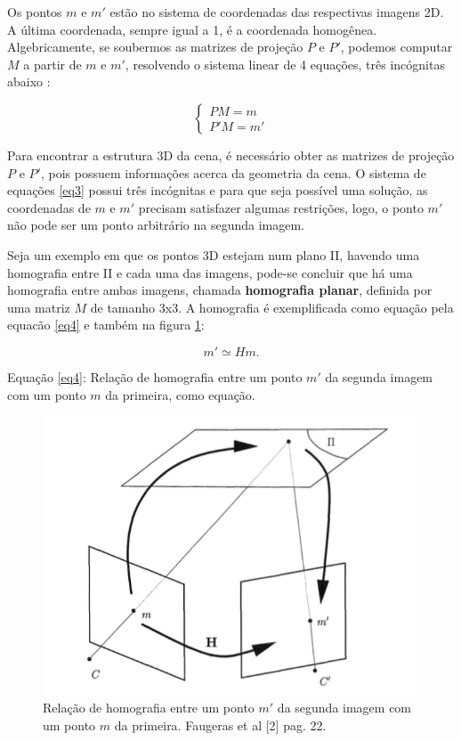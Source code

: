 Os pontos $m$ e $m'$ estão no sistema de coordenadas das respectivas imagens 2D. A última coordenada, sempre igual a 1, é a coordenada homogênea.
Algebricamente, se soubermos as matrizes de projeção $P$ e $P'$, podemos computar $M$ a partir de $m$ e $m'$, resolvendo o sistema linear de 4 equações, três incógnitas abaixo \cite{Faugeras-Geometry}:

\begin{equation}\label{eq3}
\begin{cases}
	PM = m \\
	P'M = m'
\end{cases}
\end{equation}

Para encontrar a estrutura 3D da cena, é necessário obter as matrizes de projeção $P$ e $P'$, pois possuem informações acerca da geometria da cena. O sistema de equações \eqref{eq3} possui três incógnitas e para que seja possível uma solução, as coordenadas de $m$ e $m'$ precisam satisfazer algumas restrições, logo, o ponto $m'$ não pode ser um ponto arbitrário na segunda imagem.

Seja um exemplo em que os pontos 3D estejam num plano II, havendo uma homografia \cite{Faugeras-Geometry} entre II e cada uma das imagens, pode-se concluir que há uma homografia entre ambas imagens, chamada \textbf{homografia planar}, definida por uma matriz $M$ de tamanho 3x3. A homografia é exemplificada como equação pela equacão \eqref{eq4} e também na figura \ref{fig1}:

\begin{equation}\label{eq4}
m' \simeq Hm.
\end{equation}

Equação \eqref{eq4}: Relação de homografia entre um ponto $m'$ da segunda imagem com um ponto $m$ da primeira, como equação.

\begin{figure}[H]
	\centering
		\includegraphics{Imagens/figura2-1.png}
	\caption{Relação de homografia entre um ponto $m'$ da segunda imagem com um ponto $m$ da primeira. Faugeras et al [2] pag. 22.}
	\label{fig1}
\end{figure}


